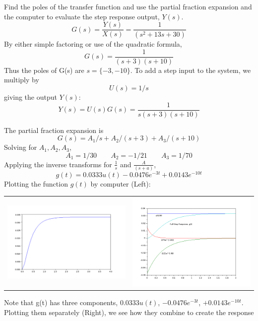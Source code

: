 \begin{ExampleSmall}

Find the poles of the transfer function
and use the partial fraction expansion and the computer to evaluate the step response output, $Y(s)$.
\[
G(s) = \frac{Y(s)}{X(s)} = \frac {1}{(s^2 + 13s + 30)}
\]
By either simple factoring or use of the quadratic formula,
\[
G(s) = \frac{1}{(s+3)(s+10)}
\]
Thus the poles of G(s) are $s=\{-3,-10\}$.   To add a step input to the system, we multiply by
\[
U(s) = 1/s
\]
giving the output $Y(s)$:
\[
Y(s) = U(s)G(s) =  \frac{1}{s(s+3)(s+10)}
\]


The partial fraction expansion is
\[
G(s) = A_1/s + A_2 /  (s+3) + A_3/ (s+10)
\]
Solving for $A_1,A_2, A_3$,
\[
A_1 = 1/30   \qquad A_2 = -1/21 \qquad A_3 = 1/70
\]
Applying the inverse transforms for $\frac{1}{s}$ and $\frac{A}{(s+a)}$,
\[
g(t) = 0.0333u(t) - 0.0476 e^{-3t} + 0.0143e^{-10t}
\]
Plotting the function $g(t)$ by computer (Left):

\begin{tabular}{cc}
\includegraphics[width=3.0in]{figs05/realstepa.png}
&
\includegraphics[width=3.0in]{figs05/step_components.png}
\end{tabular}

Note that g(t) has three components,  $0.0333u(t)$, $ - 0.0476 e^{-3t}$, $ +0.0143e^{-10t}$.   Plotting
them separately (Right), we see how they combine to create the response


\end{ExampleSmall}


